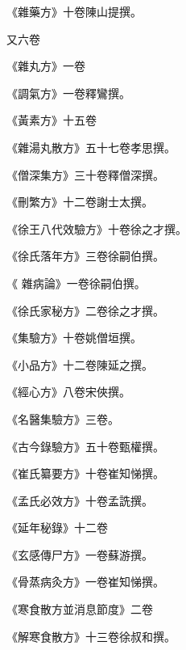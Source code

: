 \begin{pinyinscope}
 《雜藥方》十卷陳山提撰。



 又六卷



 《雜丸方》一卷



 《調氣方》一卷釋鸞撰。



 《黃素方》十五卷



 《雜湯丸散方》五十七卷孝思撰。



 《僧深集方》三十卷釋僧深撰。



 《刪繁方》十二卷謝士太撰。



 《徐王八代效驗方》十卷徐之才撰。



 《徐氏落年方》三卷徐嗣伯撰。



 《
 雜病論》一卷徐嗣伯撰。



 《徐氏家秘方》二卷徐之才撰。



 《集驗方》十卷姚僧垣撰。



 《小品方》十二卷陳延之撰。



 《經心方》八卷宋俠撰。



 《名醫集驗方》三卷。



 《古今錄驗方》五十卷甄權撰。



 《崔氏纂要方》十卷崔知悌撰。



 《孟氏必效方》十卷孟詵撰。



 《延年秘錄》十二卷



 《玄感傳尸方》一卷蘇游撰。



 《骨蒸病灸方》一卷崔知悌撰。



 《寒食散方並消息節度》二卷



 《解寒食散方》十三卷徐叔和撰。




\end{pinyinscope}
